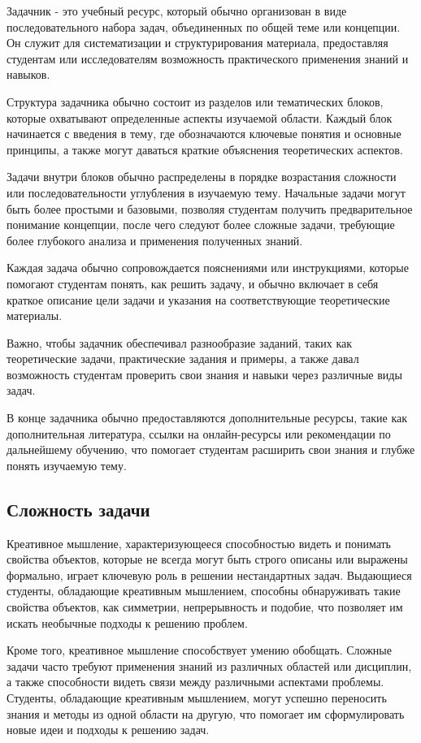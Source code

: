 Задачник - это учебный ресурс, который обычно организован в виде последовательного набора задач, объединенных по общей теме или концепции. Он служит для систематизации и структурирования материала, предоставляя студентам или исследователям возможность практического применения знаний и навыков.

Структура задачника обычно состоит из разделов или тематических блоков, которые охватывают определенные аспекты изучаемой области. Каждый блок начинается с введения в тему, где обозначаются ключевые понятия и основные принципы, а также могут даваться краткие объяснения теоретических аспектов.

Задачи внутри блоков обычно распределены в порядке возрастания сложности или последовательности углубления в изучаемую тему. Начальные задачи могут быть более простыми и базовыми, позволяя студентам получить предварительное понимание концепции, после чего следуют более сложные задачи, требующие более глубокого анализа и применения полученных знаний.

Каждая задача обычно сопровождается пояснениями или инструкциями, которые помогают студентам понять, как решить задачу, и обычно включает в себя краткое описание цели задачи и указания на соответствующие теоретические материалы.

Важно, чтобы задачник обеспечивал разнообразие заданий, таких как теоретические задачи, практические задания и примеры, а также давал возможность студентам проверить свои знания и навыки через различные виды задач.

В конце задачника обычно предоставляются дополнительные ресурсы, такие как дополнительная литература, ссылки на онлайн-ресурсы или рекомендации по дальнейшему обучению, что помогает студентам расширить свои знания и глубже понять изучаемую тему.

\subsection{Сложность задачи}

Креативное мышление, характеризующееся способностью видеть и понимать свойства объектов, которые не всегда могут быть строго описаны или выражены формально, играет ключевую роль в решении нестандартных задач. Выдающиеся студенты, обладающие креативным мышлением, способны обнаруживать такие свойства объектов, как симметрии, непрерывность и подобие, что позволяет им искать необычные подходы к решению проблем.

Кроме того, креативное мышление способствует умению обобщать. Сложные задачи часто требуют применения знаний из различных областей или дисциплин, а также способности видеть связи между различными аспектами проблемы. Студенты, обладающие креативным мышлением, могут успешно переносить знания и методы из одной области на другую, что помогает им сформулировать новые идеи и подходы к решению задач.

